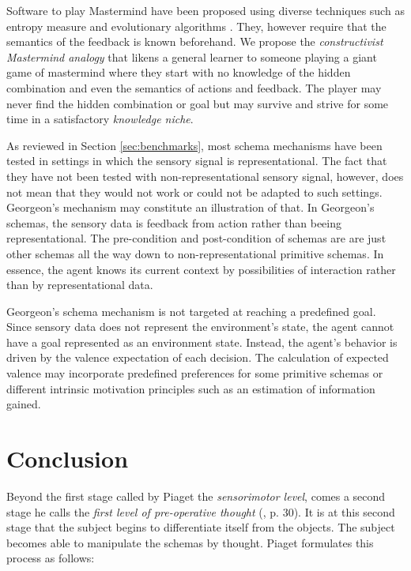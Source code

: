 \documentclass[runningheads]{llncs}
\begin{document}
Software to play Mastermind have been proposed using diverse techniques such as entropy measure and evolutionary algorithms \cite{cotta_entropy-driven_2010}.
They, however require that the semantics of the feedback is known beforehand. 
We propose the \textit{constructivist Mastermind analogy} that likens a general learner to someone playing a giant game of mastermind where they start with no knowledge of the hidden combination and even the semantics of actions and feedback.
The player may never find the hidden combination or goal but may survive and strive for some time in a satisfactory \textit{knowledge niche}.

As reviewed in Section \ref{sec:benchmarks}, most schema mechanisms have been tested in settings in which the sensory signal is representational.
The fact that they have not been tested with non-representational sensory signal, however, does not mean that they would not work or could not be adapted to such settings. 
Georgeon's mechanism may constitute an illustration of that.  
In Georgeon's schemas, the sensory data is feedback from action rather than beeing representational. 
The pre-condition and post-condition of schemas are are just other schemas all the way down to non-representational primitive schemas. 
In essence, the agent knows its current context by possibilities of interaction rather than by representational data. 

Georgeon's schema mechanism is not targeted at reaching a predefined goal. Since sensory data does not represent the environment's state, the agent cannot have a goal represented as an environment state. Instead, the agent's behavior is driven by the valence expectation of each decision. 
The calculation of expected valence may incorporate predefined preferences for some primitive schemas or different intrinsic motivation principles such as an estimation of information gained. 


\section{Conclusion}

Beyond the first stage called by Piaget the \textit{sensorimotor level}, comes a second stage he calls the \textit{first level of pre-operative thought} (\cite{piaget_lepistemologie_2011}, p. 30). 
It is at this second stage that the subject begins to differentiate itself from the objects. 
The subject becomes able to manipulate the schemas by thought. 
Piaget formulates this process as follows: 
\\
\end{document}
